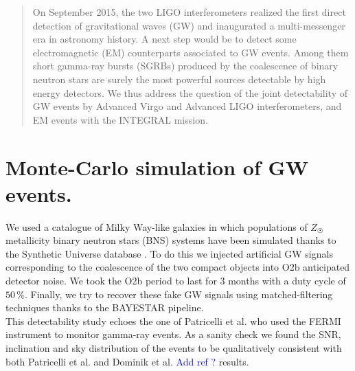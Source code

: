 \documentclass[a0,portrait]{a0poster}
\begin{document}
\begin{multicols}{2} %


 \begin{abstract}
On September 2015, the two LIGO interferometers realized the first direct detection of gravitational waves (GW) and inaugurated a multi-messenger era in astronomy history. A next step would be to detect some electromagnetic (EM) counterparts associated to GW events. Among them short gamma-ray bursts (SGRBs) produced by the coalescence of binary neutron stars are surely the most powerful sources detectable by high energy detectors. We thus address the question of the joint detectability of GW events by Advanced Virgo and Advanced LIGO interferometers, and EM events with the INTEGRAL mission.%
 \end{abstract}

\section*{Monte-Carlo simulation of GW events.}


\indent We used a catalogue of Milky Way-like galaxies in which populations of $Z_{\astrosun}$ metallicity binary neutron stars (BNS) systems have been simulated thanks to the Synthetic Universe database \cite{syntheticUniverse}. To do this we injected artificial GW signals corresponding to the coalescence of the two compact objects into O2b anticipated detector noise.  We took the O2b period to last for 3 months with a duty cycle of $50 \, \%$. Finally, we try to recover these fake GW signals using matched-filtering techniques thanks to the BAYESTAR pipeline. \\
\indent This detectability study echoes the one of Patricelli et al. \cite{2016arXiv160606124P} who used the \textsc{FERMI} instrument to monitor gamma-ray events.  As a sanity check we found the SNR, inclination and sky distribution of the events to be qualitatively consistent with both Patricelli et al. and Dominik et al. \textcolor{blue}{Add ref ?} results. \\



\end{multicols}
\end{document}
